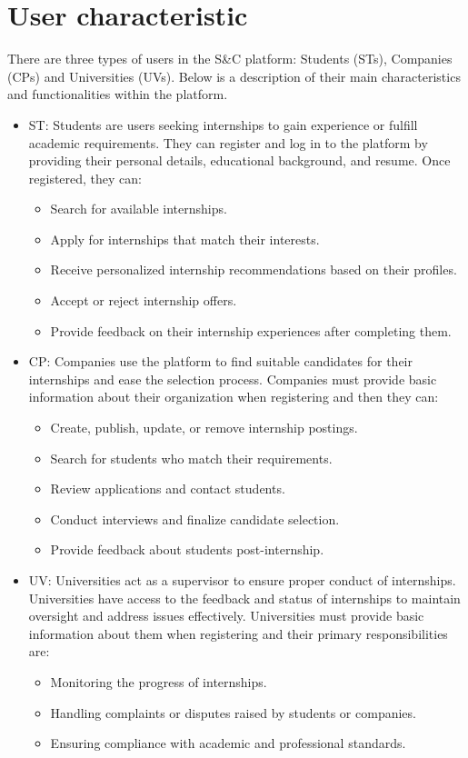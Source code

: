 \section{User characteristic}
\label{sec:User_characteristic}%
There are three types of users in the S\&C platform: Students (STs), Companies (CPs) and Universities (UVs). Below is a description of their main characteristics and functionalities within the platform.
\begin{itemize}
    \item ST: Students are users seeking internships to gain experience or fulfill academic requirements. They can register and log in to the platform by providing their personal details, educational background, and resume. Once registered, they can:
    \begin{itemize}
        \item Search for available internships.
        \item Apply for internships that match their interests.
        \item Receive personalized internship recommendations based on their profiles.
        \item Accept or reject internship offers.
        \item Provide feedback on their internship experiences after completing them.
    \end{itemize}
    \item CP: Companies use the platform to find suitable candidates for their internships and ease the selection process. Companies must provide basic information about their organization when registering and then they can:
    \begin{itemize}
        \item Create, publish, update, or remove internship postings.
        \item Search for students who match their requirements.
        \item Review applications and contact students.
        \item Conduct interviews and finalize candidate selection.
        \item Provide feedback about students post-internship.
    \end{itemize}
    \item UV: Universities act as a supervisor to ensure proper conduct of internships. Universities have access to the feedback and status of internships to maintain oversight and address issues effectively. Universities must provide basic information about them when registering and their primary responsibilities are:
    \begin{itemize}
        \item Monitoring the progress of internships.
        \item Handling complaints or disputes raised by students or companies.
        \item Ensuring compliance with academic and professional standards.
    \end{itemize}
\end{itemize}

